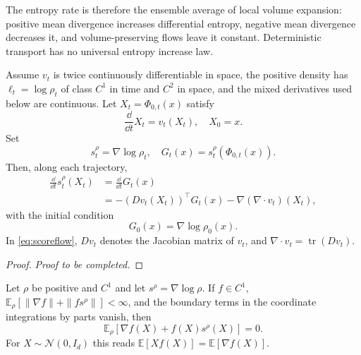 \documentclass[12pt,a4paper,oneside]{book}
\begin{document}
The entropy rate is therefore the ensemble average of local volume expansion: positive mean divergence increases differential
entropy, negative mean divergence decreases it, and volume-preserving flows leave it constant. Deterministic transport has
no universal entropy increase law.

\begin{proposition}
\label{prop:score}
\label{src:p9q11}
Assume $v_t$ is twice continuously differentiable in space, the positive density has $\ell_t=\log\rho_t$ of class $C^1$ 
in time and $C^2$ in space, and the mixed derivatives used below are continuous. Let $X_t=\Phi_{0,t}(x)$ satisfy
\begin{equation*}
    \frac{\dd}{\dd t}X_t=v_t(X_t), \quad X_0=x.
\end{equation*}
Set
\begin{equation*}
    s_t^\rho=\nabla\log\rho_t, \quad G_t(x)=s_t^\rho(\Phi_{0,t}(x)).
\end{equation*}
Then, along each trajectory,
\begin{equation}
    \begin{aligned}
        \frac{\dd}{\dd t}s_t^\rho(X_t) &= \frac{\dd}{\dd t}G_t(x) \\
        &= -(Dv_t(X_t))^\top G_t(x) -\nabla(\nabla\cdot v_t)(X_t),
    \end{aligned}
    \label{eq:scoreflow}
\end{equation}
with the initial condition
\begin{equation*}
    G_0(x)=\nabla\log\rho_0(x).
\end{equation*}
In \eqref{eq:scoreflow}, $Dv_t$ denotes the Jacobian matrix of $v_t$, and $\nabla\cdot v_t=\operatorname{tr}(Dv_t)$.
\end{proposition}

\begin{proof}
\noindent\textit{Proof to be completed.}
\end{proof}


\begin{proposition}
\label{prop:stein}
\label{src:p11q8}
Let $\rho$ be positive and $C^1$ and let $s^\rho=\nabla\log\rho$. If $f\in C^1$, $\mathbb E_\rho[\|\nabla f\|+\|fs^\rho\|]<\infty$, 
and the boundary terms in the coordinate integrations by parts vanish, then
\begin{equation*}
    \mathbb E_\rho[\nabla f(X)+f(X)s^\rho(X)]=0.
\end{equation*}
For $X\sim\mathcal N(0,I_d)$ this reads $\mathbb E[Xf(X)]=\mathbb E[\nabla f(X)]$.
\end{proposition}
\end{document}
